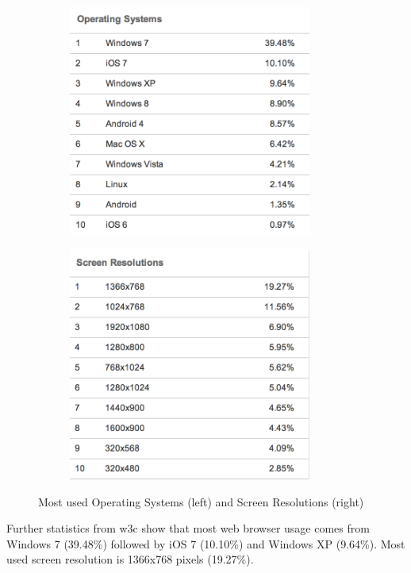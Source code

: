 \documentclass[a4paper,11pt,twoside]{article}
\begin{document}
\begin{figure}
\centering
\begin{subfigure}{.5\textwidth}
  \centering
  \includegraphics[width=80mm]{graphics/webStats_03.png}
  \label{fig:sub1}
\end{subfigure}%
\begin{subfigure}{.5\textwidth}
  \centering
  \includegraphics[width=80mm]{graphics/webStats_04.png}

  \label{fig:sub2}
\end{subfigure}

\caption{Most used Operating Systems (left) and Screen Resolutions (right)}

\end{figure}

Further statistics from w3c show that most web browser usage comes from Windows 7 (39.48\%) followed by iOS 7 (10.10\%) and Windows XP (9.64\%). Most used screen resolution is 1366x768 pixels (19.27\%).
\end{document}
